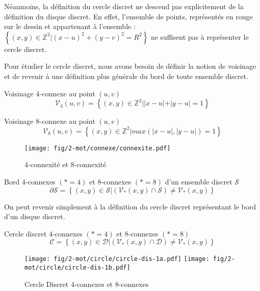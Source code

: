Néanmoins, la définition du cercle discret ne descend pas explicitement de la définition du disque discret. En effet, l'ensemble de points, représentés en rouge sur le dessin et appartenant à l'ensemble : $\left\{ (x,y) \in \mathbb{Z}^{2} |  (x - u)^2 + (y - v)^2 = R^2 \right\}$ ne suffisent pas à représenter le cercle discret. 

Pour étudier le cercle discret, nous avons besoin de définir la notion de voisinage et de revenir à une définition plus générale du bord de toute ensemble discret.\\

\begin{Definition}{Voisinage 4-connexe au point $(u,v)$}
\label{def:vois-4}
  $$\mathcal{V}_4(u,v) =  \left\{ (x,y) \in \mathbb{Z}^{2} |  |x-u|+|y-u| = 1 \right\}$$
\end{Definition}

\begin{Definition}{Voisinage 8-connexe au point $(u,v)$}
\label{def:vois-8}
  $$\mathcal{V}_8(u,v) =  \left\{ (x,y) \in \mathbb{Z}^{2} |  max(|x-u|,|y-u|) = 1 \right\}$$
\end{Definition}

\begin{figure}[H]
  \centering
  \texttt{[image: fig/2-mot/connexe/connexite.pdf]}
  \caption{4-connexité et 8-connexité}
\end{figure}



\begin{Definition}{Bord 4-connexes $(*=4)$ et 8-connexes $(*=8)$ d'un ensemble discret $\mathcal{S}$}
\label{def:bord-ens}
  $$ \partial \mathcal{S} =  \left\{ (x,y) \in \mathcal{S} | \left( \mathcal{V}_{*}(x,y) \cap \mathcal{S} \right) \neq \mathcal{V}_{*}(x,y) \right\}$$
\end{Definition}

On peut revenir simplement à la définition du cercle discret représentant le bord d'un disque discret.

\begin{Definition}{Cercle discret 4-connexes $(*=4)$ et 8-connexes $(*=8)$}
\label{def:cer-dis}
  $$ \mathcal{C} =  \left\{ (x,y) \in \mathcal{D} | \left( \mathcal{V}_{*}(x,y) \cap \mathcal{D} \right) \neq \mathcal{V}_{*}(x,y) \right\}$$
\end{Definition}

\begin{figure}[H]
  \centering
  \texttt{[image: fig/2-mot/circle/circle-dis-1a.pdf]}
  \texttt{[image: fig/2-mot/circle/circle-dis-1b.pdf]}
  \caption{Cercle Discret 4-connexes et 8-connexes}
\end{figure}


